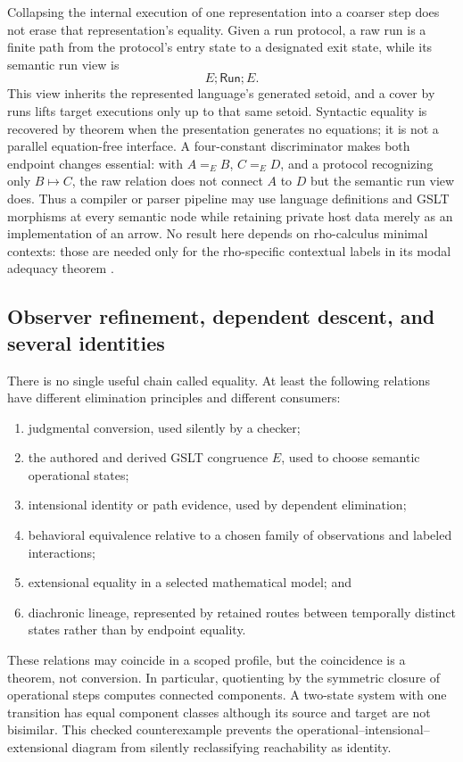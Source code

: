 \documentclass[11pt]{article}
\theoremstyle{definition}
\theoremstyle{remark}
\begin{document}
Collapsing the internal execution of one representation into a coarser step
does not erase that representation's equality.  Given a run protocol, a raw
run is a finite path from the protocol's entry state to a designated exit
state, while its semantic run view is
\[
  E\mathbin{;}\mathsf{Run}\mathbin{;}E.
\]
This view inherits the represented language's generated setoid, and a cover by
runs lifts target executions only up to that same setoid.  Syntactic equality
is recovered by theorem when the presentation generates no equations; it is
not a parallel equation-free interface.  A four-constant discriminator makes
both endpoint changes essential: with $A=_{E}B$, $C=_{E}D$, and a protocol
recognizing only $B\mapsto C$, the raw relation does not connect $A$ to $D$
but the semantic run view does.  Thus a compiler or parser pipeline may use
language definitions and GSLT morphisms at every semantic node while retaining
private host data merely as an implementation of an arrow.  No result here
depends on rho-calculus minimal contexts: those are needed only for the
rho-specific contextual labels in its modal adequacy theorem
\cite{MeredithFindingMind}.

\subsection{Observer refinement, dependent descent, and several identities}

There is no single useful chain called equality.  At least the following
relations have different elimination principles and different consumers:

\begin{enumerate}
\item judgmental conversion, used silently by a checker;
\item the authored and derived GSLT congruence $E$, used to choose semantic
  operational states;
\item intensional identity or path evidence, used by dependent elimination;
\item behavioral equivalence relative to a chosen family of observations and
  labeled interactions;
\item extensional equality in a selected mathematical model; and
\item diachronic lineage, represented by retained routes between temporally
  distinct states rather than by endpoint equality.
\end{enumerate}

These relations may coincide in a scoped profile, but the coincidence is a
theorem, not conversion.  In particular, quotienting by the symmetric closure
of operational steps computes connected components.  A two-state system with
one transition has equal component classes although its source and target are
not bisimilar.  This checked counterexample prevents the
operational--intensional--extensional diagram from silently reclassifying
reachability as identity.
\end{document}
